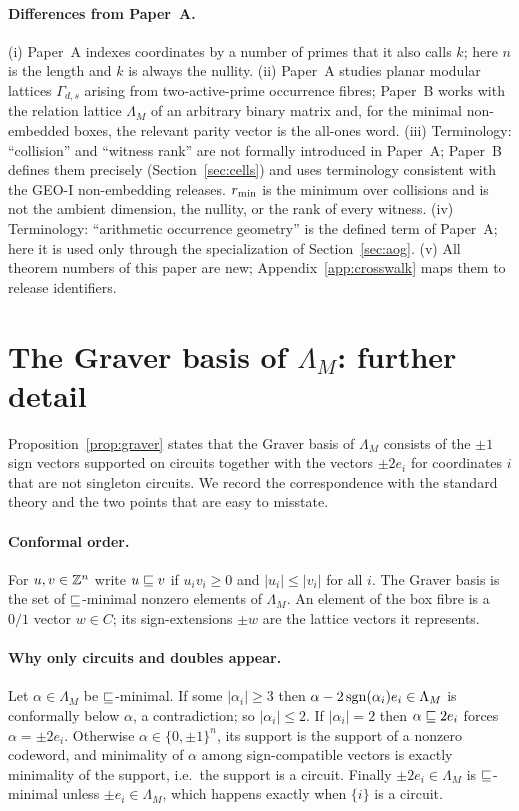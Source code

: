 \paragraph{Differences from Paper~A.}
(i) Paper~A indexes coordinates by a number of primes that it also calls $k$; here $n$ is the length and $k$ is always the nullity. (ii) Paper~A studies planar modular lattices $\Gamma_{d,s}$ arising from two-active-prime occurrence fibres; Paper~B works with the relation lattice $\Lambda_M$ of an arbitrary binary matrix and, for the minimal non-embedded boxes, the relevant parity vector is the all-ones word. (iii) Terminology: ``collision'' and ``witness rank'' are not formally introduced in Paper~A; Paper~B defines them precisely (Section~\ref{sec:cells}) and uses terminology consistent with the GEO-I non-embedding releases. $r_{\min}$ is the minimum over collisions and is not the ambient dimension, the nullity, or the rank of every witness. (iv) Terminology: ``arithmetic occurrence geometry'' is the defined term of Paper~A; here it is used only through the specialization of Section~\ref{sec:aog}. (v) All theorem numbers of this paper are new; Appendix~\ref{app:crosswalk} maps them to release identifiers.

\section{The Graver basis of \texorpdfstring{$\Lambda_M$}{Lambda\_M}: further detail}\label{app:B}

Proposition~\ref{prop:graver} states that the Graver basis of $\Lambda_M$ consists of the $\pm1$ sign vectors supported on circuits together with the vectors $\pm2e_i$ for coordinates $i$ that are not singleton circuits. We record the correspondence with the standard theory \cite{Graver1975,Sturmfels1996,Hemmecke2003} and the two points that are easy to misstate.

\paragraph{Conformal order.} For $u,v\in\mathbb Z^n$ write $u\sqsubseteq v$ if $u_iv_i\ge0$ and $|u_i|\le|v_i|$ for all $i$. The Graver basis is the set of $\sqsubseteq$-minimal nonzero elements of $\Lambda_M$. An element of the box fibre is a $0/1$ vector $w\in C$; its sign-extensions $\pm w$ are the lattice vectors it represents.

\paragraph{Why only circuits and doubles appear.} Let $\alpha\in\Lambda_M$ be $\sqsubseteq$-minimal. If some $|\alpha_i|\ge3$ then $\alpha-2\operatorname{sgn}(\alpha_i)e_i\in\Lambda_M$ is conformally below $\alpha$, a contradiction; so $|\alpha_i|\le2$. If $|\alpha_i|=2$ then $\alpha\sqsubseteq2e_i$ forces $\alpha=\pm2e_i$. Otherwise $\alpha\in\{0,\pm1\}^n$, its support is the support of a nonzero codeword, and minimality of $\alpha$ among sign-compatible vectors is exactly minimality of the support, i.e.\ the support is a circuit. Finally $\pm2e_i\in\Lambda_M$ is $\sqsubseteq$-minimal unless $\pm e_i\in\Lambda_M$, which happens exactly when $\{i\}$ is a circuit.

